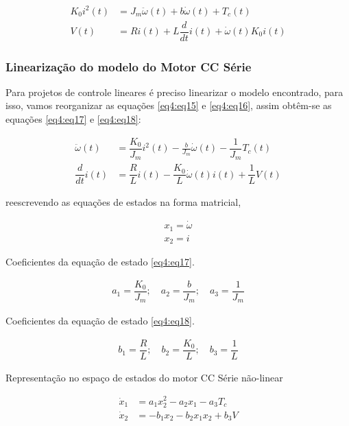 \begin{align}
	K_0 i^2(t) &= J_m\ddot{\omega}(t) + b\dot{\omega}(t) + T_c(t) \label{eq4:eq15}\\
	V(t) &= Ri(t)+ L\dfrac{d}{dt}i(t) + \dot{\omega}(t)K_0 i(t) \label{eq4:eq16}
\end{align}

\vspace{1cm}

\subsubsection{Linearização do modelo do Motor CC Série}

Para projetos de controle lineares é preciso linearizar o modelo encontrado, para isso, vamos reorganizar as equações \ref{eq4:eq15} e \ref{eq4:eq16}, assim obtêm-se as equações \ref{eq4:eq17} e \ref{eq4:eq18}:

\begin{align}
    \ddot{\omega}(t) &= \dfrac{K_0}{J_m} i^2(t) - \frac{b}{J_m}\dot{\omega}(t) - \dfrac{1}{J_m}T_c(t) \label{eq4:eq17}\\
    \dfrac{d}{dt}i(t) &= \dfrac{R}{L}i(t)- \dfrac{K_0}{L}\dot{\omega}(t)i(t) +\dfrac{1}{L}V(t) \label{eq4:eq18}
\end{align}

reescrevendo as equações de estados na forma matricial,

\begin{align}
    x_1 = \dot{\omega}  \label{eq4:eq19}\\
    x_2 = i   \label{eq4:eq20}
\end{align}


Coeficientes da equação de estado \ref{eq4:eq17}.

\begin{align}
    a_1 = \dfrac{K_0}{J_m}; \quad a_2 = \dfrac{b}{J_m}; \quad a_3 = \dfrac{1}{J_m}  \label{eq4:eq21}
\end{align}

Coeficientes da equação de estado \ref{eq4:eq18}.

\begin{align}
    b_1 = \dfrac{R}{L}; \quad b_2 = \dfrac{K_0}{L}; \quad b_3 = \dfrac{1}{L}  \label{eq4:eq22}
\end{align}

Representação no espaço de estados do motor CC Série não-linear

\begin{align}
    \dot{x}_1 &= a_1x_2^2  - a_2x_1 -a_3T_c   \label{eq4:eq23}\\
    \dot{x}_2 &= -b_1x_2  -b_2x_1x_2 + b_3V    \label{eq4:eq24}
\end{align}



